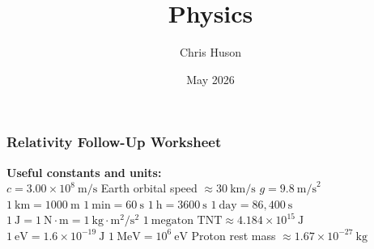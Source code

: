 \documentclass[12pt, twoside]{article}
\title{Physics}
\author{Chris Huson}
\date{May 2026}
\begin{document}
\subsubsection*{Relativity Follow-Up Worksheet}

\textbf{Useful constants and units:} \\
$c = 3.00\times10^{8}~\text{m/s}$ \quad Earth orbital speed $\approx 30~\text{km/s}$ \quad $g = 9.8~\text{m/s}^{2}$ \\
$1~\text{km} = 1000~\text{m}$ \quad $1~\text{min} = 60~\text{s}$ \quad $1~\text{h} = 3600~\text{s}$ \quad $1~\text{day} = 86{,}400~\text{s}$ \\
$1~\text{J} = 1~\text{N}\cdot\text{m} = 1~\text{kg}\cdot\text{m}^{2}/\text{s}^{2}$ \quad $1~\text{megaton TNT} \approx 4.184\times10^{15}~\text{J}$ \\
$1~\text{eV} = 1.6\times10^{-19}~\text{J}$ \quad $1~\text{MeV} = 10^{6}~\text{eV}$ \quad Proton rest mass $\approx 1.67\times10^{-27}~\text{kg}$

\vspace{0.3cm}
\end{document}

